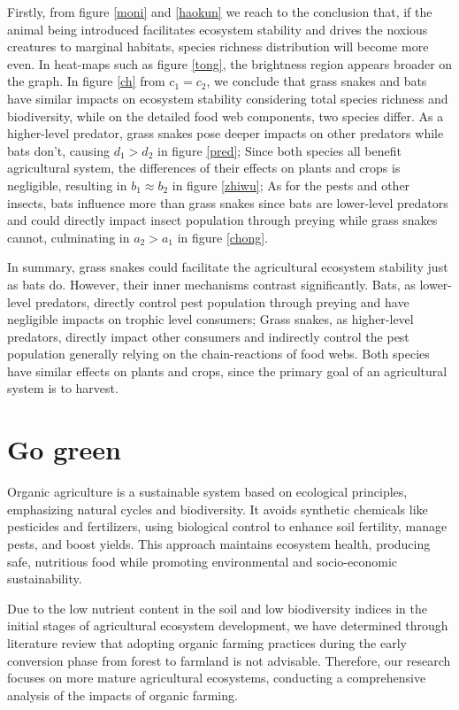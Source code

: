 \documentclass[12pt]{article}
\begin{document}
	Firstly, from figure \ref{moni} and \ref{haokun} we reach to the conclusion that, if the animal being introduced facilitates ecosystem stability and drives the noxious creatures to marginal habitats, species richness distribution will become more even. In heat-maps such as figure \ref{tong}, the brightness region appears broader on the graph. In figure \ref{ch} from  $c_1=c_2$, we conclude that grass snakes and bats have similar impacts on ecosystem stability considering total species richness and biodiversity, while on the detailed food web components, two species differ. As a higher-level predator, grass snakes pose deeper impacts on other predators while bats don't, causing $d_1>d_2$ in figure \ref{pred}; Since both species all benefit agricultural system, the differences of their effects on plants and crops is negligible, resulting in $b_1\approx b_2$ in figure \ref{zhiwu}; As for the pests and other insects, bats influence more than grass snakes since bats are lower-level predators and could directly impact insect population through preying while grass snakes cannot, culminating in $a_2>a_1$ in figure \ref{chong}. 
	
	In summary, grass snakes could facilitate the agricultural ecosystem stability just as bats do. However, their inner mechanisms contrast significantly. Bats, as lower-level predators, directly control pest population through preying  and have negligible impacts on trophic level consumers; Grass snakes, as higher-level predators, directly impact other consumers and indirectly control the pest population generally relying on the chain-reactions of food webs. Both species have similar effects on plants and crops, since the primary goal of an agricultural system is to harvest.
	\section{Go green}
	\hspace{2em}Organic agriculture is a sustainable system based on ecological principles, emphasizing natural cycles and biodiversity. It avoids synthetic chemicals like pesticides and fertilizers, using biological control to enhance soil fertility, manage pests, and boost yields. This approach maintains ecosystem health, producing safe, nutritious food while promoting environmental and socio-economic sustainability.
	
	Due to the low nutrient content in the soil and low biodiversity indices in the initial stages of agricultural ecosystem development, we have determined through literature review that adopting organic farming practices during the early conversion phase from forest to farmland is not advisable. Therefore, our research focuses on more mature agricultural ecosystems, conducting a comprehensive analysis of the impacts of organic farming.
	
\end{document}
